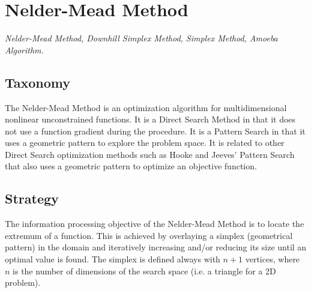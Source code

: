 
\section{Nelder-Mead Method} 
\label{sec:neldermead}

\emph{Nelder-Mead Method, Downhill Simplex Method, Simplex Method, Amoeba Algorithm.}

\subsection{Taxonomy}
The Nelder-Mead Method is an optimization algorithm for multidimensional nonlinear unconstrained functions.
It is a Direct Search Method in that it does not use a function gradient during the procedure. It is a Pattern Search in that it uses a geometric pattern to explore the problem space.
It is related to other Direct Search optimization methods such as Hooke and Jeeves' Pattern Search that also uses a geometric pattern to optimize an objective function.

\subsection{Strategy}
The information processing objective of the Nelder-Mead Method is to locate the extremum of a function.
This is achieved by overlaying a simplex (geometrical pattern) in the domain and iteratively increasing and/or reducing its size until an optimal value is found. The simplex is defined always with $n+1$ vertices, where $n$ is the number of dimensions of the search space (i.e. a triangle for a 2D problem).

